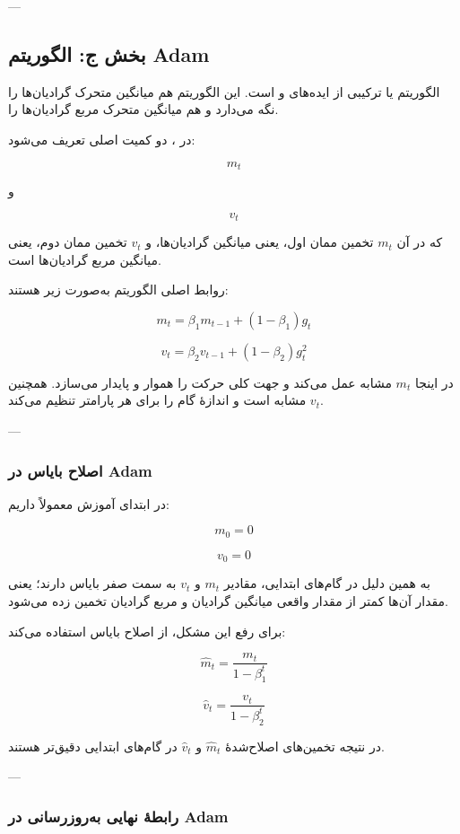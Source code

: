 \documentclass[12pt,a4paper]{article}
\begin{document}
---

\subsection{بخش ج: الگوریتم Adam}

الگوریتم  یا  ترکیبی از ایده‌های  و  است. این الگوریتم هم میانگین متحرک گرادیان‌ها را نگه می‌دارد و هم میانگین متحرک مربع گرادیان‌ها را.

در ، دو کمیت اصلی تعریف می‌شود:

\[
m_t
\]

و

\[
v_t
\]

که در آن \(m_t\) تخمین ممان اول، یعنی میانگین گرادیان‌ها، و \(v_t\) تخمین ممان دوم، یعنی میانگین مربع گرادیان‌ها است.

روابط اصلی الگوریتم  به‌صورت زیر هستند:

\[
m_t = \beta_1 m_{t-1} + (1-\beta_1)g_t
\]

\[
v_t = \beta_2 v_{t-1} + (1-\beta_2)g_t^2
\]

در اینجا \(m_t\) مشابه  عمل می‌کند و جهت کلی حرکت را هموار و پایدار می‌سازد. همچنین \(v_t\) مشابه  است و اندازهٔ گام را برای هر پارامتر تنظیم می‌کند.

---

\subsubsection{اصلاح بایاس در Adam}

در ابتدای آموزش معمولاً داریم:

\[
m_0=0
\]

\[
v_0=0
\]

به همین دلیل در گام‌های ابتدایی، مقادیر \(m_t\) و \(v_t\) به سمت صفر بایاس دارند؛ یعنی مقدار آن‌ها کمتر از مقدار واقعی میانگین گرادیان و مربع گرادیان تخمین زده می‌شود.

برای رفع این مشکل،  از اصلاح بایاس استفاده می‌کند:

\[
\hat{m}_t=\frac{m_t}{1-\beta_1^t}
\]

\[
\hat{v}_t=\frac{v_t}{1-\beta_2^t}
\]

در نتیجه تخمین‌های اصلاح‌شدهٔ \(\hat{m}_t\) و \(\hat{v}_t\) در گام‌های ابتدایی دقیق‌تر هستند.

---

\subsubsection{رابطهٔ نهایی به‌روزرسانی در Adam}
\end{document}
